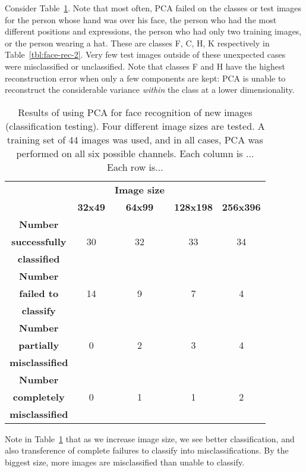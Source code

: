 Consider Table~\ref{tbl:face-rec-3}. Note that most often, PCA failed on the classes or test images for the person whose hand was over his face, the person who had the most different positions and expressions, the person who had only two training images, or the person wearing a hat. These are classes F, C, H, K respectively in Table~\ref{tbl:face-rec-2}. Very few test images outside of these unexpected cases were misclassified or unclassified. Note that classes F and H have the highest reconstruction error when only a few components are kept: PCA is unable to reconstruct the considerable variance \emph{within} the class at a lower dimensionality.

\begin{table}[h!]
  \centering
  \begin{tabular}{c c c c c}
    \toprule
    \textbf{ } & \textbf{} & \textbf{Image size} & \textbf{} & \textbf{}\\
    \textbf{ } & \textbf{ 32x49 } & \textbf{ 64x99 } & \textbf{128x198} & \textbf{256x396}\\
    \midrule
    \textbf{Number} & {} & {} & {} & {} \\
    \textbf{successfully} & 30 & 32 & 33 & 34\\
    \textbf{classified} & {} & {} & {} & {} \\
    \midrule
    \textbf{Number} & {} & {} & {} & {} \\
    \textbf{failed to} & 14 & 9 & 7 & 4\\
    \textbf{classify} & {} & {} & {} & {} \\
    \midrule
    \textbf{Number} & {} & {} & {} & {} \\
    \textbf{partially} & 0 & 2 & 3 & 4\\
    \textbf{misclassified} & {} & {} & {} & {} \\
    \midrule
    \textbf{Number} & {} & {} & {} & {} \\
    \textbf{completely} & 0 & 1 & 1 & 2\\
    \textbf{misclassified} & {} & {} & {} & {} \\
    \bottomrule
  \end{tabular}
  \caption[Results of classification testing for different-sized images]{Results of using PCA for face recognition of new images (classification testing). Four different image sizes are tested. A training set of 44 images was used, and in all cases, PCA was performed on all six possible channels. Each column is ... Each row is...}
  \label{tbl:face-rec-3}
\end{table}

Note in Table~\ref{tbl:face-rec-3} that as we increase image size, we see better classification, and also transference of complete failures to classify into misclassifications. By the biggest size, more images are misclassified than unable to classify.



